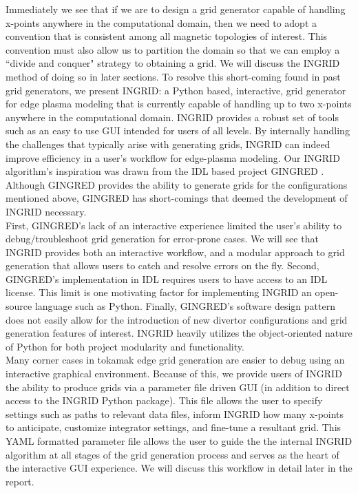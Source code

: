 Immediately we see that if we are to design a grid generator capable of handling x-points anywhere in the computational domain, then we need to adopt a convention that is consistent among all magnetic topologies of interest. This convention must also allow us to partition the domain so that we can employ a ``divide and conquer" strategy to obtaining a grid. We will discuss the INGRID method of doing so in later sections.
To resolve this short-coming found in past grid generators, we present INGRID: a Python based, interactive, grid generator for edge plasma modeling that is currently capable of handling up to two x-points anywhere in the computational domain. INGRID provides a robust set of tools such as an easy to use GUI intended for users of all levels. By internally handling the challenges that typically arise with generating grids, INGRID can indeed improve efficiency in a user's workflow for edge-plasma modeling. Our INGRID algorithm's inspiration was drawn from the IDL based project GINGRED \cite{izacard_umansky}. Although GINGRED provides the ability to generate grids for the configurations mentioned above, GINGRED has short-comings that deemed the development of INGRID necessary.\\
\indent
First, GINGRED's lack of an interactive experience limited the user's ability to debug/troubleshoot grid generation for error-prone cases. We will see that INGRID provides both an interactive workflow, and a modular approach to grid generation that allows users to catch and resolve errors on the fly. Second, GINGRED's implementation in IDL requires users to have access to an IDL license. This limit is one motivating factor for implementing INGRID an open-source language such as Python. Finally, GINGRED's software design pattern does not easily allow for the introduction of new divertor configurations and grid generation features of interest. INGRID heavily utilizes the object-oriented nature of Python for both project modularity and functionality.\\ \indent
Many corner cases in tokamak edge grid generation are easier to debug using an interactive graphical environment. Because of this, we provide users of INGRID the ability to produce grids via a parameter file driven GUI (in addition to direct access to the INGRID Python package). This file allows the user to specify settings such as paths to relevant data files, inform INGRID how many x-points to anticipate, customize integrator settings, and fine-tune a resultant grid. This YAML formatted parameter file allows the user to guide the the internal INGRID algorithm at all stages of the grid generation process and serves as the heart of the interactive GUI experience. We will discuss this workflow in detail later in the report.\\
